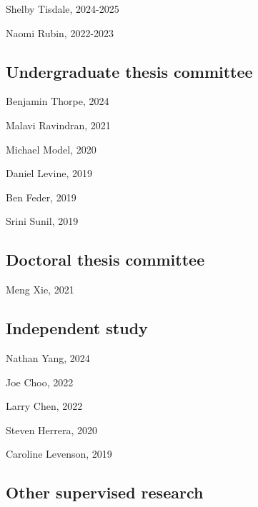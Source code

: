 \documentclass[11pt,dvipsnames]{article}
\providecommand{\tightlist}{%
  \setlength{\itemsep}{0pt}\setlength{\parskip}{0pt}}
\renewenvironment{itemize}{
  \begin{list}{}{
    \setlength{\leftmargin}{1.5em}
  }
}{
  \end{list}
}
\begin{document}
\begin{itemize}
\item Shelby Tisdale, 2024-2025
\item Naomi Rubin, 2022-2023
\end{itemize}

\subsection{Undergraduate thesis
committee}\label{undergraduate-thesis-committee}

\begin{itemize}
\item Benjamin Thorpe, 2024
\item Malavi Ravindran, 2021
\item Michael Model, 2020
\item Daniel Levine, 2019
\item Ben Feder, 2019
\item Srini Sunil, 2019
\end{itemize}

\subsection{Doctoral thesis committee}\label{doctoral-thesis-committee}

\begin{itemize}
\tightlist
\item
  Meng Xie, 2021
\end{itemize}

\subsection{Independent study}\label{independent-study}

\begin{itemize}
\item Nathan Yang, 2024
\item Joe Choo, 2022
\item Larry Chen, 2022
\item Steven Herrera, 2020
\item Caroline Levenson, 2019
\end{itemize}

\subsection{Other supervised research}\label{other-supervised-research}
\end{document}
